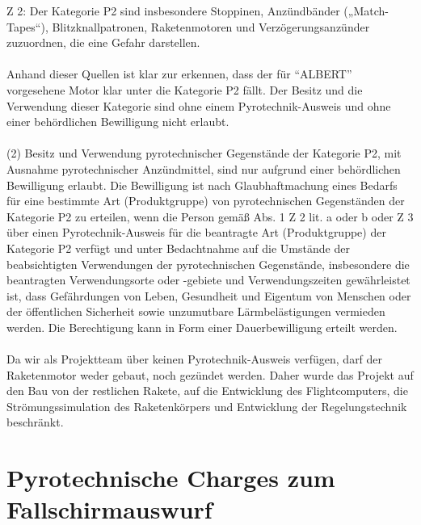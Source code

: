 Z 2: Der Kategorie P2 sind insbesondere Stoppinen, Anzündbänder („Match-Tapes“), Blitzknallpatronen, Raketenmotoren und Verzögerungsanzünder zuzuordnen, die eine Gefahr darstellen. \parencite{pyro_law_2010}
\\
\\
Anhand dieser Quellen ist klar zur erkennen, dass der für "`ALBERT"' vorgesehene Motor klar unter die Kategorie P2 fällt. Der Besitz und die Verwendung dieser Kategorie sind ohne einem Pyrotechnik-Ausweis und ohne einer behördlichen Bewilligung nicht erlaubt.
\\
\\
(2) Besitz und Verwendung pyrotechnischer Gegenstände der Kategorie P2, mit Ausnahme pyrotechnischer Anzündmittel, sind nur aufgrund einer behördlichen Bewilligung erlaubt. Die Bewilligung ist nach Glaubhaftmachung eines Bedarfs für eine bestimmte Art (Produktgruppe) von pyrotechnischen Gegenständen der Kategorie P2 zu erteilen, wenn die Person gemäß Abs. 1 Z 2 lit. a oder b oder Z 3 über einen Pyrotechnik-Ausweis für die beantragte Art (Produktgruppe) der Kategorie P2 verfügt und unter Bedachtnahme auf die Umstände der beabsichtigten Verwendungen der pyrotechnischen Gegenstände, insbesondere die beantragten Verwendungsorte oder -gebiete und Verwendungszeiten gewährleistet ist, dass Gefährdungen von Leben, Gesundheit und Eigentum von Menschen oder der öffentlichen Sicherheit sowie unzumutbare Lärmbelästigungen vermieden werden. Die Berechtigung kann in Form einer Dauerbewilligung erteilt werden. \parencite{pyroTG_jusline}
\\
\\
Da wir als Projektteam über keinen Pyrotechnik-Ausweis verfügen, darf der Raketenmotor weder gebaut, noch gezündet werden. Daher wurde das Projekt auf den Bau von der restlichen Rakete, auf die Entwicklung des Flightcomputers, die Strömungssimulation des Raketenkörpers und Entwicklung der Regelungstechnik beschränkt.

\section{Pyrotechnische Charges zum Fallschirmauswurf}
\label{sec:pyro_charges_legal}
\newpage

